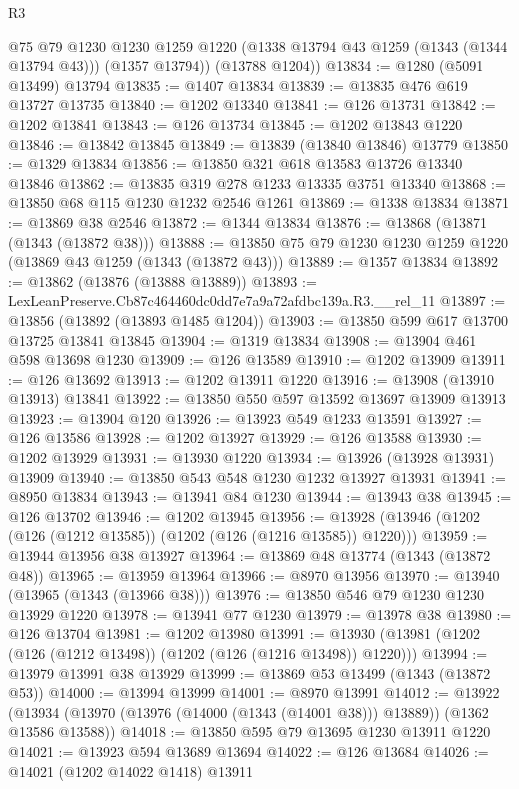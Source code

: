 \begin{lexlean}{R3}
\begin{coremodule}
        @75
        @79
        @1230
        @1230
        @1259
        @1220
        (@1338 @13794 @43 @1259 (@1343 (@1344 @13794 @43)))
        (@1357 @13794))
      (@13788 @1204))
@13834 := @1280 (@5091 @13499) @13794
@13835 := @1407 @13834
@13839 := @13835 @476 @619 @13727 @13735
@13840 := @1202 @13340
@13841 := @126 @13731
@13842 := @1202 @13841
@13843 := @126 @13734
@13845 := @1202 @13843 @1220
@13846 := @13842 @13845
@13849 := @13839 (@13840 @13846) @13779
@13850 := @1329 @13834
@13856 := @13850 @321 @618 @13583 @13726 @13340 @13846
@13862 := @13835 @319 @278 @1233 @13335 @3751 @13340
@13868 := @13850 @68 @115 @1230 @1232 @2546 @1261
@13869 := @1338 @13834
@13871 := @13869 @38 @2546
@13872 := @1344 @13834
@13876 := @13868 (@13871 (@1343 (@13872 @38)))
@13888 := @13850 @75 @79 @1230 @1230 @1259 @1220 (@13869 @43 @1259 (@1343 (@13872 @43)))
@13889 := @1357 @13834
@13892 := @13862 (@13876 (@13888 @13889))
@13893 := LexLeanPreserve.Cb87c464460dc0dd7e7a9a72afdbc139a.R3.__rel_11
@13897 := @13856 (@13892 (@13893 @1485 @1204))
@13903 := @13850 @599 @617 @13700 @13725 @13841 @13845
@13904 := @1319 @13834
@13908 := @13904 @461 @598 @13698 @1230
@13909 := @126 @13589
@13910 := @1202 @13909
@13911 := @126 @13692
@13913 := @1202 @13911 @1220
@13916 := @13908 (@13910 @13913) @13841
@13922 := @13850 @550 @597 @13592 @13697 @13909 @13913
@13923 := @13904 @120
@13926 := @13923 @549 @1233 @13591
@13927 := @126 @13586
@13928 := @1202 @13927
@13929 := @126 @13588
@13930 := @1202 @13929
@13931 := @13930 @1220
@13934 := @13926 (@13928 @13931) @13909
@13940 := @13850 @543 @548 @1230 @1232 @13927 @13931
@13941 := @8950 @13834
@13943 := @13941 @84 @1230
@13944 := @13943 @38
@13945 := @126 @13702
@13946 := @1202 @13945
@13956 := @13928 (@13946 (@1202 (@126 (@1212 @13585)) (@1202 (@126 (@1216 @13585)) @1220)))
@13959 := @13944 @13956 @38 @13927
@13964 := @13869 @48 @13774 (@1343 (@13872 @48))
@13965 := @13959 @13964
@13966 := @8970 @13956
@13970 := @13940 (@13965 (@1343 (@13966 @38)))
@13976 := @13850 @546 @79 @1230 @1230 @13929 @1220
@13978 := @13941 @77 @1230
@13979 := @13978 @38
@13980 := @126 @13704
@13981 := @1202 @13980
@13991 := @13930 (@13981 (@1202 (@126 (@1212 @13498)) (@1202 (@126 (@1216 @13498)) @1220)))
@13994 := @13979 @13991 @38 @13929
@13999 := @13869 @53 @13499 (@1343 (@13872 @53))
@14000 := @13994 @13999
@14001 := @8970 @13991
@14012 := @13922
    (@13934 (@13970 (@13976 (@14000 (@1343 (@14001 @38))) @13889)) (@1362 @13586 @13588))
@14018 := @13850 @595 @79 @13695 @1230 @13911 @1220
@14021 := @13923 @594 @13689 @13694
@14022 := @126 @13684
@14026 := @14021 (@1202 @14022 @1418) @13911

\end{coremodule}
\end{lexlean}
